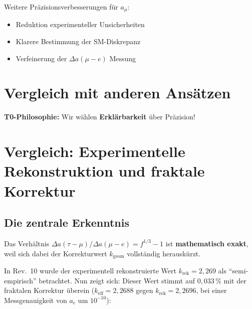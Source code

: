 	Weitere Präzisionsverbesserungen für $a_\mu$:
	\begin{itemize}
		\item Reduktion experimenteller Unsicherheiten
		\item Klarere Bestimmung der SM-Diskrepanz
		\item Verfeinerung der $\Delta a(\mu - e)$ Messung
	\end{itemize}
	
	\section{Vergleich mit anderen Ansätzen}
	
	\begin{table}[h]
		\centering
		\caption{Vergleich verschiedener Ansätze}
	\end{table}
	
	\textbf{T0-Philosophie:} Wir wählen \textbf{Erklärbarkeit} über Präzision!
	\section{Vergleich: Experimentelle Rekonstruktion und fraktale Korrektur}
	
	\subsection{Die zentrale Erkenntnis}
	
	Das Verhältnis $\Delta a(\tau-\mu) / \Delta a(\mu-e) = f^{1/3} - 1$ ist \textbf{mathematisch exakt}, weil sich dabei der Korrekturwert $k_{\text{geom}}$ vollständig herauskürzt.
	
	In Rev.~10 wurde der experimentell rekonstruierte Wert $k_\text{rek} = 2{,}269$ als \enquote{semi-empirisch} betrachtet. Nun zeigt sich: Dieser Wert stimmt auf $0{,}033\,\%$ mit der fraktalen Korrektur überein ($k_\text{eff} = 2{,}2688$ gegen $k_\text{rek} = 2{,}2696$, bei einer Messgenauigkeit von $a_e$ um $10^{-10}$):
	
